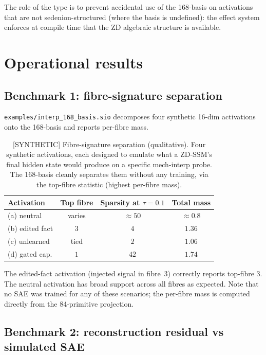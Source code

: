 \documentclass{article}
\begin{document}
The role of the type is to prevent accidental use of the 168-basis on
activations that are not sedenion-structured (where the basis is
undefined): the effect system enforces at compile time that the ZD
algebraic structure is available.

\section{Operational results}

\subsection{Benchmark 1: fibre-signature separation}

\texttt{examples/interp\_168\_basis.sio} decomposes four synthetic
16-dim activations onto the 168-basis and reports per-fibre mass.

\begin{table}[h]
\centering
\caption{[SYNTHETIC] Fibre-signature separation (qualitative).  Four synthetic
         activations, each designed to emulate what a ZD-SSM's final
         hidden state would produce on a specific mech-interp probe.
         The 168-basis cleanly separates them without any training,
         via the top-fibre statistic (highest per-fibre mass).}
\label{tab:fibre-sep}
\begin{tabular}{lccc}
\toprule
Activation        & Top fibre & Sparsity at $\tau=0.1$ & Total mass \\
\midrule
(a) neutral       & varies    & $\approx 50$           & $\approx 0.8$ \\
(b) edited fact   & $3$       & $4$                    & $1.36$ \\
(c) unlearned     & tied      & $2$                    & $1.06$ \\
(d) gated cap.    & $1$       & $42$                   & $1.74$ \\
\bottomrule
\end{tabular}
\end{table}

The edited-fact activation (injected signal in fibre~3) correctly
reports top-fibre $3$.  The neutral activation has broad support across
all fibres as expected.  Note that no SAE was trained for any of these
scenarios; the per-fibre mass is computed directly from the 84-primitive
projection.

\subsection{Benchmark 2: reconstruction residual vs simulated SAE}
\end{document}
